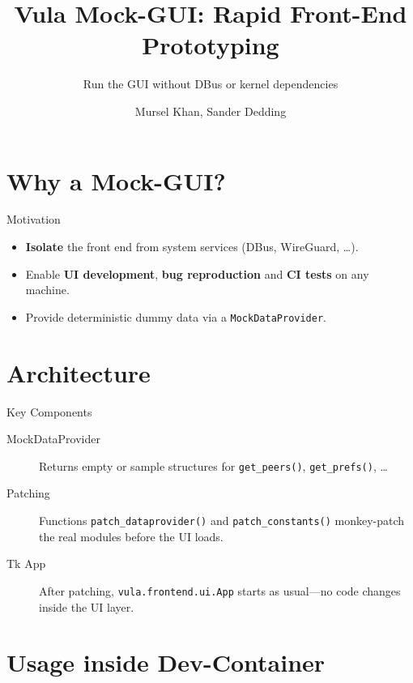 \documentclass[
  ngerman,          %
  authorontitle=true,
]{bfhbeamer}
\title{Vula Mock-GUI: Rapid Front-End Prototyping}
\subtitle{Run the GUI without DBus or kernel dependencies}
\author{Mursel Khan, Sander Dedding}
\institute{Vula Project}
\begin{document}
\maketitle

\section{Why a Mock-GUI?}

\begin{frame}{Motivation}
  \begin{itemize}
    \item \textbf{Isolate} the front end from system services (DBus, WireGuard, \dots).
    \item Enable \textbf{UI development}, \textbf{bug reproduction} and \textbf{CI tests} on any machine.
    \item Provide deterministic dummy data via a \texttt{MockDataProvider}.
  \end{itemize}
\end{frame}

\section{Architecture}

\begin{frame}{Key Components}
  \begin{description}
    \item[MockDataProvider] Returns empty or sample structures for \texttt{get\_peers()}, \texttt{get\_prefs()}, \dots
    \item[Patching] Functions \texttt{patch\_dataprovider()} and \texttt{patch\_constants()} monkey-patch the real modules before the UI loads.
    \item[Tk App] After patching, \texttt{vula.frontend.ui.App} starts as usual—no code changes inside the UI layer.
  \end{description}
\end{frame}

\section{Usage inside Dev-Container}
\end{document}
